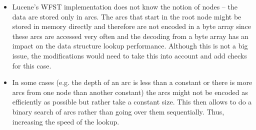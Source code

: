 \begin{itemize}
\begin{figure}[htbp]
        \caption{Comparison of memory usage when changing number encoding}
        \label{enc_comp}
    \end{figure}

    The memory usage increased by approximately $22$ \% for \textit{English words} dataset. However, it can be
    almost doubled as can be seen on \textit{Linux kernel} dataset where approximately $92$ \% size increase can be noted.
    The graph \ref{enc_comp} also shows the case when the encoding would use \textit{long} datatype. Although Lucene's \textit{Lookup}
    interface specifies \textit{long} datatype, WFST implementation supports only \textit{int} so far.

    \item Lucene's WFST implementation does not know the notion of nodes – the data are stored only in arcs. The arcs that
    start in the root node might be stored in memory directly and therefore are not encoded in a byte array since these
    arcs are accessed very often
    and the decoding from a byte array has an impact on the data structure lookup performance. Although this is not a big issue,
    the modifications would need to take this into account and add checks for this case.

    \item In some cases (e.g. the depth of an arc is less than a constant or there is more arcs from one node than
    another constant) the arcs
    might not be encoded as efficiently as possible but rather take a constant size. This then allows to do a binary
    search of arcs rather than going over them sequentially. Thus, increasing the speed of the lookup.


\end{itemize}
